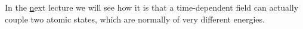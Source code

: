 In the \href{}next lecture we will see how it is that a time-dependent field can actually couple two atomic states, which are normally of very different energies.